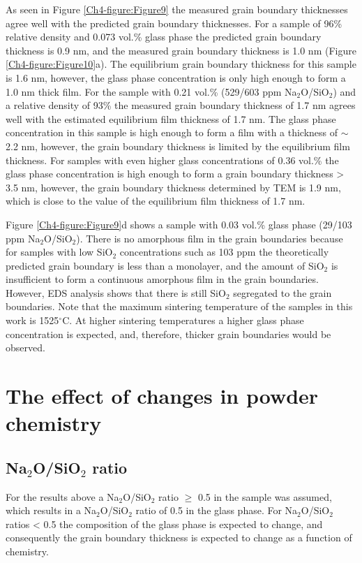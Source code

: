 As seen in Figure \ref{Ch4-figure:Figure9} the measured grain boundary thicknesses agree well with the predicted grain boundary thicknesses. For a sample of 96\% relative density and 0.073 vol.\% glass phase the predicted grain boundary thickness is 0.9 nm, and the measured grain boundary thickness is 1.0 nm (Figure \ref{Ch4-figure:Figure10}a). The equilibrium grain boundary thickness for this sample is 1.6 nm, however, the glass phase concentration is only high enough to form a 1.0 nm thick film. For the sample with 0.21 vol.\% (529/603 ppm Na$_{2}$O/SiO$_{2}$) and a relative density of 93\% the measured grain boundary thickness of 1.7 nm agrees well with the estimated equilibrium film thickness of 1.7 nm. The glass phase concentration in this sample is high enough to form a film with a thickness of $\sim$2.2 nm, however, the grain boundary thickness is limited by the equilibrium film thickness. For samples with even higher glass concentrations of 0.36 vol.\% the glass phase concentration is high enough to form a grain boundary thickness > 3.5 nm, however, the grain boundary thickness determined by TEM is 1.9 nm, which is close to the value of the equilibrium film thickness of 1.7 nm.

Figure \ref{Ch4-figure:Figure9}d shows a sample with 0.03 vol.\% glass phase (29/103 ppm Na$_{2}$O/SiO$_{2}$). There is no amorphous film in the grain boundaries because for samples with low SiO$_{2}$ concentrations such as 103 ppm the theoretically predicted grain boundary is less than a monolayer, and the amount of SiO$_{2}$ is insufficient to form a continuous amorphous film in the grain boundaries. However, EDS analysis shows that there is still SiO$_{2}$ segregated to the grain boundaries. Note that the maximum sintering temperature of the samples in this work is 1525$^{\circ}$C. At higher sintering temperatures a higher glass phase concentration is expected, and, therefore, thicker grain boundaries would be observed.

\section{The effect of changes in powder chemistry}
\subsection{Na$_{2}$O/SiO$_{2}$ ratio}
For the results above a Na$_{2}$O/SiO$_{2}$ ratio $\geq$ 0.5 in the sample was assumed, which results in a Na$_{2}$O/SiO$_{2}$ ratio of 0.5 in the glass phase. For Na$_{2}$O/SiO$_{2}$ ratios < 0.5 the composition of the glass phase is expected to change, and consequently the grain boundary thickness is expected to change as a function of chemistry. 

